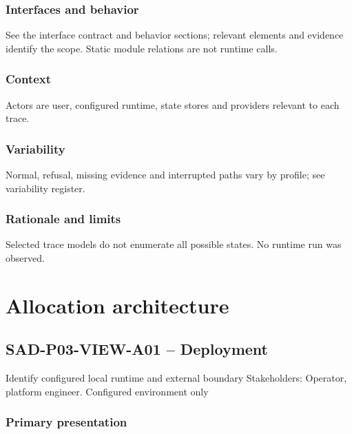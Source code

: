 \documentclass[10pt,letterpaper]{article}
\begin{document}
\subsubsection{Interfaces and behavior}
See the interface contract and behavior sections; relevant elements and evidence identify the scope. Static module relations are not runtime calls.
\subsubsection{Context}
Actors are user, configured runtime, state stores and providers relevant to each trace.
\subsubsection{Variability}
Normal, refusal, missing evidence and interrupted paths vary by profile; see variability register.
\subsubsection{Rationale and limits}
Selected trace models do not enumerate all possible states. No runtime run was observed.

\section{Allocation architecture}
\subsection{SAD-P03-VIEW-A01 -- Deployment}
Identify configured local runtime and external boundary Stakeholders: Operator, platform engineer. Configured environment only
\subsubsection{Primary presentation}
\end{document}
